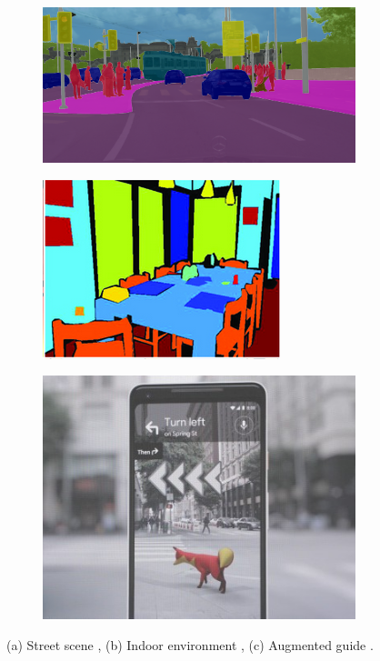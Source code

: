 	\begin{figure}
		\centering
		\begin{subfigure}{.3\textwidth}
			\centering
			\includegraphics[width=.95\linewidth]{images/auto_driving}
			\caption{}
			\label{Fig:appauto}
		\end{subfigure}
		\begin{subfigure}{.3\textwidth}
			\centering
			\includegraphics[width=.8\linewidth]{images/indoor}
			\caption{}
			\label{Fig:approbo}
		\end{subfigure}
		\begin{subfigure}{.3\textwidth}
			\centering
			\includegraphics[width=.8\linewidth]{images/vr_dog}
			\caption{}
			\label{Fig:appaug}
		\end{subfigure}
		\caption{(a) Street scene \cite{cityscapes}, (b) Indoor environment \cite{indoor}, (c) Augmented guide \cite{techcrunch}.}
		\label{Fig:app}
	\end{figure}


